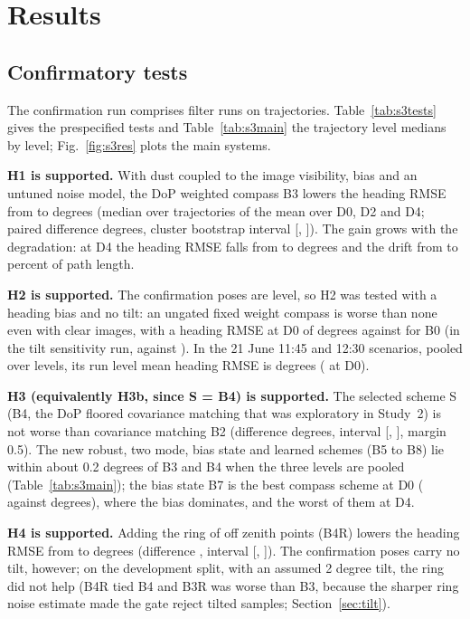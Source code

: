 \section{Results}
\label{sec:results}
\subsection{Confirmatory tests}
The confirmation run comprises \sNrowsConf{} filter runs on \sNconf{} trajectories. Table~\ref{tab:s3tests} gives the prespecified tests and Table~\ref{tab:s3main} the trajectory level medians by level; Fig.~\ref{fig:s3res} plots the main systems.

\textbf{H1 is supported.} With dust coupled to the image visibility, bias and an untuned noise model, the DoP weighted compass B3 lowers the heading RMSE from \sHoneB{} to \sHoneA{} degrees (median over trajectories of the mean over D0, D2 and D4; paired difference \sHonediff{} degrees, cluster bootstrap interval [\sHonelo{}, \sHonehi{}]). The gain grows with the degradation: at D4 the heading RMSE falls from \scBzeroDfourhd{} to \scBthreeDfourhd{} degrees and the drift from \scBzeroDfourdr{} to \scBthreeDfourdr{} percent of path length.

\textbf{H2 is supported.} The confirmation poses are level, so H2 was tested with a heading bias and no tilt: an ungated fixed weight compass is worse than none even with clear images, with a heading RMSE at D0 of \sHtwoA{} degrees against \sHtwoB{} for B0 (in the tilt sensitivity run, \stBoneDzerohd{} against \stBzeroDzerohd{}). In the 21 June 11:45 and 12:30 scenarios, pooled over levels, its run level mean heading RMSE is \snoonBonePooled{} degrees (\snoonBoneDzero{} at D0).

\textbf{H3 (equivalently H3b, since S = B4) is supported.} The selected scheme S (B4, the DoP floored covariance matching that was exploratory in Study~2) is not worse than covariance matching B2 (difference \sHthreediff{} degrees, interval [\sHthreelo{}, \sHthreehi{}], margin 0.5). The new robust, two mode, bias state and learned schemes (B5 to B8) lie within about 0.2 degrees of B3 and B4 when the three levels are pooled (Table~\ref{tab:s3main}); the bias state B7 is the best compass scheme at D0 (\scBsevenDzerohd{} against \scBthreeDzerohd{} degrees), where the bias dominates, and the worst of them at D4.

\textbf{H4 is supported.} Adding the ring of off zenith points (B4R) lowers the heading RMSE from \sHfourB{} to \sHfourA{} degrees (difference \sHfourdiff{}, interval [\sHfourlo{}, \sHfourhi{}]). The confirmation poses carry no tilt, however; on the development split, with an assumed 2 degree tilt, the ring did not help (B4R tied B4 and B3R was worse than B3, because the sharper ring noise estimate made the gate reject tilted samples; Section~\ref{sec:tilt}).

